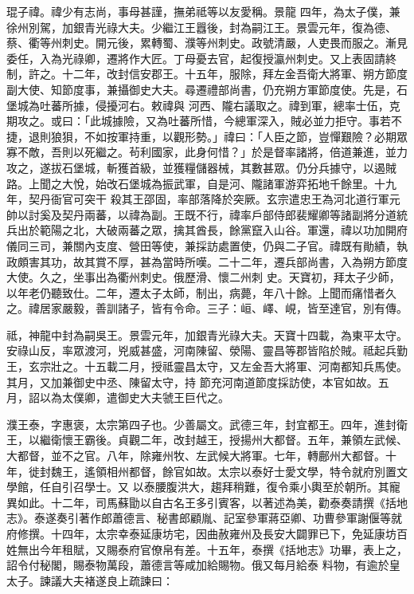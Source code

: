 \begin{pinyinscope}
 琨子禕。禕少有志尚，事母甚謹，撫弟祗等以友愛稱。景龍
 四年，為太子僕，兼徐州別駕，加銀青光祿大夫。少繼江王囂後，封為嗣江王。景雲元年，復為德、蔡、衢等州刺史。開元後，累轉蜀、濮等州刺史。政號清嚴，人吏畏而服之。漸見委任，入為光祿卿，遷將作大匠。丁母憂去官，起復授瀛州刺史。又上表固請終制，許之。十二年，改封信安郡王。十五年，服除，拜左金吾衛大將軍、朔方節度副大使、知節度事，兼攝御史大夫。尋遷禮部尚書，仍充朔方軍節度使。先是，石堡城為吐蕃所據，侵擾河右。敕禕與
 河西、隴右議取之。禕到軍，總率士伍，克期攻之。或曰：「此城據險，又為吐蕃所惜，今總軍深入，賊必並力拒守。事若不捷，退則狼狽，不如按軍持重，以觀形勢。」禕曰：「人臣之節，豈憚艱險？必期眾寡不敵，吾則以死繼之。茍利國家，此身何惜？」於是督率諸將，倍道兼進，並力攻之，遂拔石堡城，斬獲首級，並獲糧儲器械，其數甚眾。仍分兵據守，以遏賊路。上聞之大悅，始改石堡城為振武軍，自是河、隴諸軍游弈拓地千餘里。十九年，契丹衙官可突干
 殺其王邵固，率部落降於突厥。玄宗遣忠王為河北道行軍元帥以討奚及契丹兩蕃，以禕為副。王既不行，禕率戶部侍郎裴耀卿等諸副將分道統兵出於範陽之北，大破兩蕃之眾，擒其酋長，餘黨竄入山谷。軍還，禕以功加開府儀同三司，兼關內支度、營田等使，兼採訪處置使，仍與二子官。禕既有勛績，執政頗害其功，故其賞不厚，甚為當時所嘆。二十二年，遷兵部尚書，入為朔方節度大使。久之，坐事出為衢州刺史。俄歷滑、懷二州刺
 史。天寶初，拜太子少師，以年老仍聽致仕。二年，遷太子太師，制出，病薨，年八十餘。上聞而痛惜者久之。禕居家嚴毅，善訓諸子，皆有令命。三子：峘、嶧、峴，皆至達官，別有傳。



 祗，神龍中封為嗣吳王。景雲元年，加銀青光祿大夫。天寶十四載，為東平太守。安祿山反，率眾渡河，兇威甚盛，河南陳留、滎陽、靈昌等郡皆陷於賊。祗起兵勤王，玄宗壯之。十五載二月，授祗靈昌太守，又左金吾大將軍、河南都知兵馬使。其月，又加兼御史中丞、陳留太守，持
 節充河南道節度採訪使，本官如故。五月，詔以為太僕卿，遣御史大夫虢王巨代之。



 濮王泰，字惠褒，太宗第四子也。少善屬文。武德三年，封宜都王。四年，進封衛王，以繼衛懷王霸後。貞觀二年，改封越王，授揚州大都督。五年，兼領左武候、大都督，並不之官。八年，除雍州牧、左武候大將軍。七年，轉鄜州大都督。十年，徙封魏王，遙領相州都督，餘官如故。太宗以泰好士愛文學，特令就府別置文學館，任自引召學士。又
 以泰腰腹洪大，趨拜稍難，復令乘小輿至於朝所。其寵異如此。十二年，司馬蘇勖以自古名王多引賓客，以著述為美，勸泰奏請撰《括地志》。泰遂奏引著作郎蕭德言、秘書郎顧胤、記室參軍蔣亞卿、功曹參軍謝偃等就府修撰。十四年，太宗幸泰延康坊宅，因曲赦雍州及長安大闢罪已下，免延康坊百姓無出今年租賦，又賜泰府官僚帛有差。十五年，泰撰《括地志》功畢，表上之，詔令付秘閣，賜泰物萬段，蕭德言等咸加給賜物。俄又每月給泰
 料物，有逾於皇太子。諫議大夫褚遂良上疏諫曰：




\end{pinyinscope}
